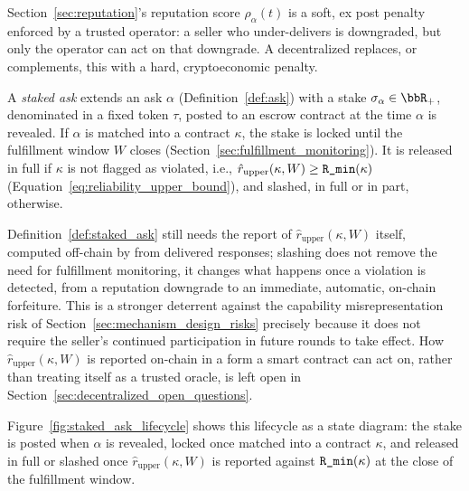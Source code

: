 Section~\ref{sec:reputation}'s reputation score $\rho_\alpha(t)$ is a soft,
ex post penalty enforced by a trusted operator: a seller who under-delivers
is downgraded, but only the operator can act on that downgrade. A
decentralized \NoesisMarket{} replaces, or complements, this with a hard,
cryptoeconomic penalty.

\begin{definition}
\label{def:staked_ask}
A \emph{staked ask} extends an ask $\alpha$ (Definition~\ref{def:ask})
with a stake $\sigma_\alpha \in \bbR_+$, denominated in a fixed token
$\tau$, posted to an escrow contract at the time $\alpha$ is revealed. If
$\alpha$ is matched into a contract $\kappa$, the stake is locked until
the fulfillment window $W$ closes (Section~\ref{sec:fulfillment_monitoring}).
It is released in full if $\kappa$ is not flagged as violated, i.e.,
$\hat r_{\text{upper}}(\kappa, W) \geq \textnormal{\texttt{R\_min}}(\kappa)$
(Equation~\eqref{eq:reliability_upper_bound}), and slashed, in full or in
part, otherwise.
\end{definition}

Definition~\ref{def:staked_ask} still needs the report of
$\hat r_{\text{upper}}(\kappa, W)$ itself, computed off-chain by
\NoesisServer{} from delivered responses; slashing does not remove the
need for fulfillment monitoring, it changes what happens once a violation
is detected, from a reputation downgrade to an immediate, automatic,
on-chain forfeiture. This is a stronger deterrent against the capability
misrepresentation risk of Section~\ref{sec:mechanism_design_risks}
precisely because it does not require the seller's continued
participation in future rounds to take effect. How $\hat
r_{\text{upper}}(\kappa, W)$ is reported on-chain in a form a smart
contract can act on, rather than treating \NoesisServer{} itself as a
trusted oracle, is left open in Section~\ref{sec:decentralized_open_questions}.

Figure~\ref{fig:staked_ask_lifecycle} shows this lifecycle as a state
diagram: the stake is posted when $\alpha$ is revealed, locked once
matched into a contract $\kappa$, and released in full or slashed once
$\hat r_{\text{upper}}(\kappa, W)$ is reported against $\textnormal{\texttt{R\_min}}(\kappa)$
at the close of the fulfillment window.

